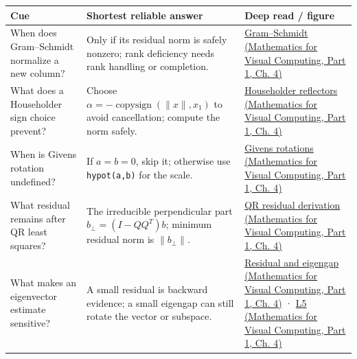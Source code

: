 {\def\LTcaptype{none} %
\begin{longtable}[]{@{}
  >{\raggedright\arraybackslash}p{}
  >{\raggedright\arraybackslash}p{}
  >{\raggedright\arraybackslash}p{}@{}}
\toprule\noalign{}
\begin{minipage}[b]{\linewidth}\raggedright
Cue
\end{minipage} & \begin{minipage}[b]{\linewidth}\raggedright
Shortest reliable answer
\end{minipage} & \begin{minipage}[b]{\linewidth}\raggedright
Deep read / figure
\end{minipage} \\
\midrule\noalign{}
\endhead
\bottomrule\noalign{}
\endlastfoot
When does Gram--Schmidt normalize a new column? & Only if its residual norm is safely nonzero; rank deficiency needs rank handling or completion. & \href{../02-Mathematics-for-Visual-Computing-P01/main.pdf\#nameddest=01-foundations-i-ch020-orthogonal-coordinates-preserve-the-shape-of-the-problem}{Gram--Schmidt (Mathematics for Visual Computing, Part 1, Ch. 4)} \\
What does a Householder sign choice prevent? & Choose \(\alpha=-\operatorname{copysign}(\|x\|,x_1)\) to avoid cancellation; compute the norm safely. & \href{../02-Mathematics-for-Visual-Computing-P01/main.pdf\#nameddest=01-foundations-i-ch020-reflections-and-plane-rotations-build-qr-without-losing-lengths}{Householder reflectors (Mathematics for Visual Computing, Part 1, Ch. 4)} \\
When is Givens rotation undefined? & If \(a=b=0\), skip it; otherwise use \texttt{hypot(a,b)} for the scale. & \href{../02-Mathematics-for-Visual-Computing-P01/main.pdf\#nameddest=01-foundations-i-ch020-reflections-and-plane-rotations-build-qr-without-losing-lengths}{Givens rotations (Mathematics for Visual Computing, Part 1, Ch. 4)} \\
What residual remains after QR least squares? & The irreducible perpendicular part \(b_\perp=(I-QQ^T)b\); minimum residual norm is \(\|b_\perp\|\). & \href{../02-Mathematics-for-Visual-Computing-P01/main.pdf\#nameddest=01-foundations-i-ch020-qr-turns-least-squares-into-a-triangular-solve-plus-an-irreducible-residual}{QR residual derivation (Mathematics for Visual Computing, Part 1, Ch. 4)} \\
What makes an eigenvector estimate sensitive? & A small residual is backward evidence; a small eigengap can still rotate the vector or subspace. & \href{../02-Mathematics-for-Visual-Computing-P01/main.pdf\#nameddest=01-foundations-i-ch020-residuals-distinguish-backward-accuracy-from-forward-certainty}{Residual and eigengap (Mathematics for Visual Computing, Part 1, Ch. 4)} · \href{../02-Mathematics-for-Visual-Computing-P01/main.pdf\#nameddest=01-foundations-i-ch020-figure-l5---eigenanalysis-is-cleanest-when-the-basis-is-orthonormal}{L5 (Mathematics for Visual Computing, Part 1, Ch. 4)} \\

\end{longtable}}
